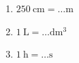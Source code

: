 \begin{MentalActivity}
\begin{mental}
    \end{mental}

    \begin{mental}
        \begin{enumerate}
            \item
                $\SI{250}{\centi\meter}=\ldots\si{\meter}$
            \item
                $\SI{1}{\liter}=\ldots\si{\deci\cubic\meter}$
            \item
                \( \SI{1}{\hour}=\ldots\si{\second}\)
        \end{enumerate}
    \end{mental}

\end{MentalActivity}

